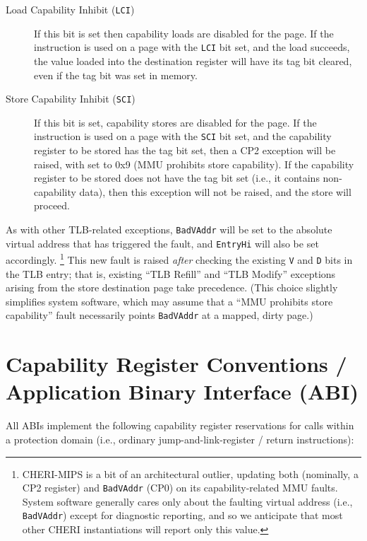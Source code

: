 \begin{description}
\item[Load Capability Inhibit (\texttt{LCI})] If this bit is set then capability
  loads are disabled for the page.
  If the  instruction is used on a page with the \texttt{LCI}
  bit set, and the load succeeds, the value loaded into the destination
  register will have its tag bit cleared, even if the tag bit was set in
  memory.

\item[Store Capability Inhibit (\texttt{SCI})] If this bit is set, capability
  stores are disabled for the page.
  If the  instruction is used on a page with the \texttt{SCI}
  bit set, and the capability register to be stored has the tag bit set, then
  a CP2 exception will be raised, with \capcausereg{} set to 0x9 (MMU
  prohibits store capability).
  If the capability register to be stored does not have the tag bit set (i.e.,
  it contains non-capability data), then this exception will not be raised,
  and the store will proceed.
\end{description}

\noindent
%
As with other TLB-related exceptions, \texttt{BadVAddr} will be set to the
absolute virtual address that has triggered the fault, and \texttt{EntryHi}
will also be set accordingly.%
%
\footnote{CHERI-MIPS is a bit of an architectural outlier, updating both
\capcausereg{} (nominally, a CP2 register) and \texttt{BadVAddr} (CP0) on its
capability-related MMU faults.  System software generally cares only about the
faulting virtual address (i.e., \texttt{BadVAddr}) except for diagnostic
reporting, and so we anticipate that most other CHERI instantiations will
report only this value.}
%
This new fault is raised \emph{after} checking
the existing \texttt{V} and \texttt{D} bits in the TLB entry; that is, existing
``TLB Refill'' and ``TLB Modify'' exceptions arising from the store destination
page take precedence.  (This choice slightly simplifies system software, which
may assume that a ``MMU prohibits store capability'' fault necessarily points
\texttt{BadVAddr} at a mapped, dirty page.)

\section{Capability Register Conventions / Application Binary Interface
  (ABI)}

All ABIs implement the following capability register reservations for calls
within a protection domain (i.e., ordinary jump-and-link-register / return
instructions):

